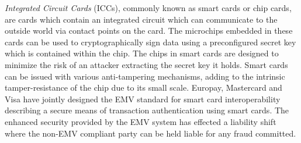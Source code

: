 \textit{Integrated Circuit Cards} (ICCs), commonly known as smart cards or chip cards, are cards which contain an integrated circuit which can communicate to the outside world via contact points on the card.
The microchips embedded in these cards can be used to cryptographically sign data using a preconfigured secret key which is contained within the chip.
\cite{herzberg2003payments,khu2002using}
The chips in smart cards are designed to minimize the risk of an attacker extracting the secret key it holds.
Smart cards can be issued with various anti-tampering mechanisms, adding to the intrinsic tamper-resistance of the chip due to its small scale. \cite{kömmerling1999design}
Europay, Mastercard and Visa have jointly designed the EMV standard for smart card interoperability describing a secure means of transaction authentication using smart cards. %
The enhanced security provided by the EMV system has effected a liability shift where the non-EMV compliant party can be held liable for any fraud committed. \cite{povey2008assessing}





